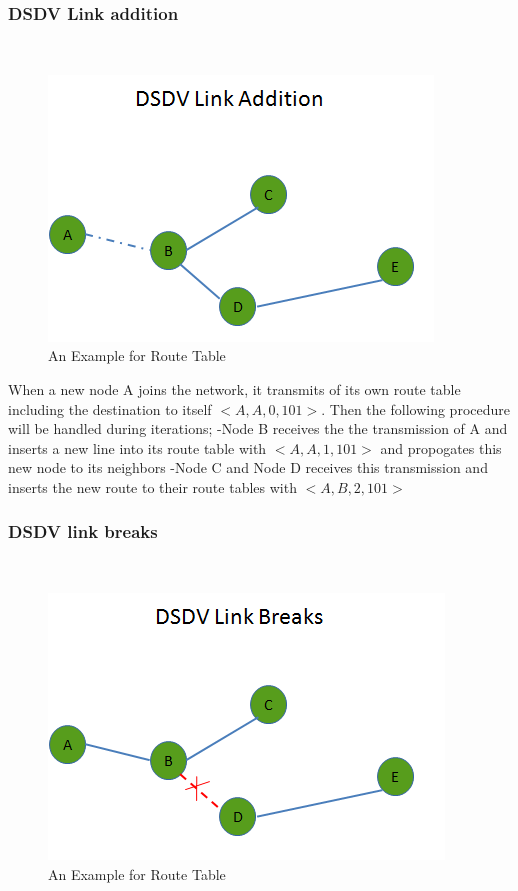 \subsubsection{DSDV Link addition}\hspace{0pt} \\
\begin{figure}[H]
\caption{An Example for Route Table}
\centering
\includegraphics[scale = 0.65]{link_add}
\end{figure}	

When a new node A joins the network, it transmits of its own route table including the destination to itself $<A,A,0,101>$. Then the following procedure will be handled during iterations; \newline
	-Node B receives the the transmission of A and inserts a new line into its route table with $<A,A,1,101>$ and propogates this new node to its neighbors \newline
	-Node C and Node D receives this transmission and inserts the new route to their route tables with $<A,B,2,101>$
		
\subsubsection{DSDV link breaks}\hspace{0pt} \\
	
\begin{figure}[H]
\caption{An Example for Route Table}
\centering
\includegraphics[scale = 0.65]{link_break}
\end{figure}

